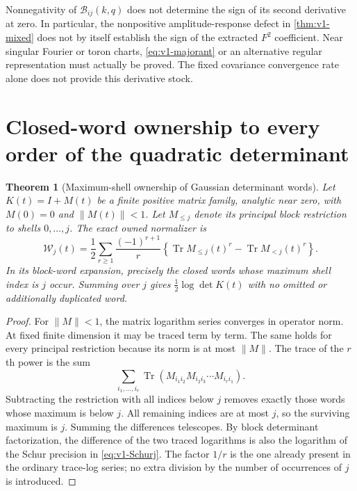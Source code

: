 \documentclass[11pt,a4paper]{article}
\newtheorem{theorem}{Theorem}[section]
\theoremstyle{definition}
\theoremstyle{remark}
\DeclareMathOperator{\Tr}{Tr}
\newcommand{\norm}[1]{\lVert #1\rVert}
\begin{document}
Nonnegativity of $\mathcal B_{ij}(k,q)$ does not determine the sign of
its second derivative at zero. In particular, the nonpositive
amplitude-response defect in \cref{thm:v1-mixed} does not by itself
establish the sign of the extracted $F^2$ coefficient. Near singular
Fourier or toron charts, \cref{eq:v1-majorant} or an alternative regular
representation must actually be proved. The fixed covariance convergence
rate alone does not provide this derivative stock.

\section{Closed-word ownership to every order of the quadratic determinant}
\label{sec:v1-words}

\begin{theorem}[Maximum-shell ownership of Gaussian determinant words]
\label{thm:v1-words}
Let $K(t)=I+M(t)$ be a finite positive matrix family, analytic near zero,
with $M(0)=0$ and $\norm{M(t)}<1$. Let $M_{\le j}$ denote its principal
block restriction to shells $0,\ldots,j$. The exact owned normalizer is
\begin{equation}\label{eq:v1-word-owner}
 \mathcal W_j(t)=\frac12\sum_{r\ge1}\frac{(-1)^{r+1}}r
 \left\{\Tr M_{\le j}(t)^r-\Tr M_{<j}(t)^r\right\}.
\end{equation}
In its block-word expansion, precisely the closed words whose maximum
shell index is $j$ occur. Summing over $j$ gives
$\tfrac12\log\det K(t)$ with no omitted or additionally duplicated word.
\end{theorem}
\begin{proof}
For $\norm{M}<1$, the matrix logarithm series converges in operator norm.
At fixed finite dimension it may be traced term by term. The same holds
for every principal restriction because its norm is at most
$\norm{M}$. The trace of the $r$th power is the sum
\[
 \sum_{i_1,\ldots,i_r}\Tr
       (M_{i_1i_2}M_{i_2i_3}\cdots M_{i_ri_1}).
\]
Subtracting the restriction with all indices below $j$ removes exactly
those words whose maximum is below $j$. All remaining indices are at
most $j$, so the surviving maximum is $j$. Summing the differences
telescopes. By block determinant factorization, the difference of the
two traced logarithms is also the logarithm of the Schur precision in
\cref{eq:v1-Schurj}. The factor $1/r$ is the one already present in the
ordinary trace-log series; no extra division by the number of occurrences
of $j$ is introduced.
\end{proof}
\end{document}

